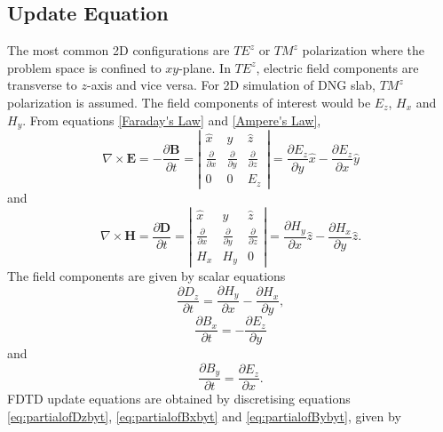 \subsection{Update Equation}
The most common 2D configurations are $TE^z$ or $TM^z$ polarization where the problem space is confined to $xy$-plane. In $TE^z$, electric field components are transverse to $z$-axis and vice versa. For 2D simulation of DNG slab, $TM^z$ polarization is assumed. The field components of interest would be $E_z$, $H_x$ and $H_y$. From equations \ref{Faraday's Law} and \ref{Ampere's Law},
\begin{equation}
\nabla \times \textbf{E} = -\dfrac{\partial \textbf{B}}{\partial t} = \left| \begin{array}{ccc} \hat{x} & \hat{y} & \hat{z} \\ \frac{\partial}{\partial x} & \frac{\partial}{\partial y} & \frac{\partial}{\partial z} \\ 0 & 0 & E_z \end{array} \right| = \dfrac{\partial E_z}{\partial y} \hat{x} - \dfrac{\partial E_z}{\partial x} \hat{y}
\label{eq:Faraday'sLawExpansionTMz}
\end{equation}
and
\begin{equation}
\nabla \times \textbf{H} = \dfrac{\partial \textbf{D}}{\partial t} = \left| \begin{array}{ccc} \hat{x} & \hat{y} & \hat{z} \\ \frac{\partial}{\partial x} & \frac{\partial}{\partial y} & \frac{\partial}{\partial z} \\ H_x & H_y & 0 \end{array} \right| = \dfrac{\partial H_y}{\partial x} \hat{z} - \dfrac{\partial H_x}{\partial y} \hat{z}.
\label{eq:Ampere'sLawExpansionTMz}
\end{equation}
The field components are given by scalar equations
\begin{equation}
\dfrac{\partial D_z}{\partial t} = \dfrac{\partial H_y}{\partial x} - \dfrac{\partial H_x}{\partial y},
\label{eq:partialofDzbyt}
\end{equation}
\begin{equation}
\dfrac{\partial B_x}{\partial t} = -\dfrac{\partial E_z}{\partial y}
\label{eq:partialofBxbyt}
\end{equation}
and
\begin{equation}
\dfrac{\partial B_y}{\partial t} = \dfrac{\partial E_z}{\partial x}.
\label{eq:partialofBybyt}
\end{equation}
FDTD update equations are obtained by discretising equations \ref{eq:partialofDzbyt}, \ref{eq:partialofBxbyt} and \ref{eq:partialofBybyt}, given by
